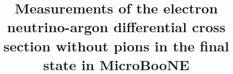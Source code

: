 \documentclass[amsmath,amssymb,aps,prd,showpacs,twocolumn,superscriptaddress,letterpaper,longbibliography, floatfix]{revtex4-2}
\begin{document}

\title{Measurements of the electron neutrino-argon differential cross section without pions in the final state in MicroBooNE}


\end{document}
